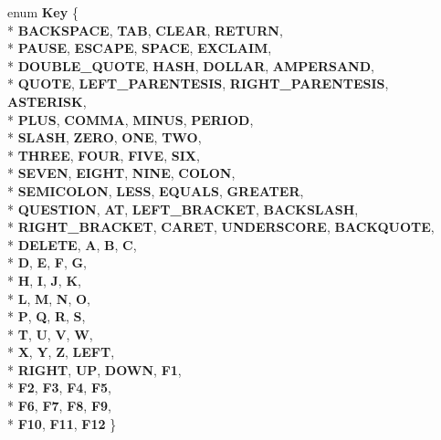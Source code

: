 \begin{DoxyCompactItemize}
\item 
enum {\bfseries Key} \{ \\*
{\bfseries B\+A\+C\+K\+S\+P\+A\+CE}, 
{\bfseries T\+AB}, 
{\bfseries C\+L\+E\+AR}, 
{\bfseries R\+E\+T\+U\+RN}, 
\\*
{\bfseries P\+A\+U\+SE}, 
{\bfseries E\+S\+C\+A\+PE}, 
{\bfseries S\+P\+A\+CE}, 
{\bfseries E\+X\+C\+L\+A\+IM}, 
\\*
{\bfseries D\+O\+U\+B\+L\+E\+\_\+\+Q\+U\+O\+TE}, 
{\bfseries H\+A\+SH}, 
{\bfseries D\+O\+L\+L\+AR}, 
{\bfseries A\+M\+P\+E\+R\+S\+A\+ND}, 
\\*
{\bfseries Q\+U\+O\+TE}, 
{\bfseries L\+E\+F\+T\+\_\+\+P\+A\+R\+E\+N\+T\+E\+S\+IS}, 
{\bfseries R\+I\+G\+H\+T\+\_\+\+P\+A\+R\+E\+N\+T\+E\+S\+IS}, 
{\bfseries A\+S\+T\+E\+R\+I\+SK}, 
\\*
{\bfseries P\+L\+US}, 
{\bfseries C\+O\+M\+MA}, 
{\bfseries M\+I\+N\+US}, 
{\bfseries P\+E\+R\+I\+OD}, 
\\*
{\bfseries S\+L\+A\+SH}, 
{\bfseries Z\+E\+RO}, 
{\bfseries O\+NE}, 
{\bfseries T\+WO}, 
\\*
{\bfseries T\+H\+R\+EE}, 
{\bfseries F\+O\+UR}, 
{\bfseries F\+I\+VE}, 
{\bfseries S\+IX}, 
\\*
{\bfseries S\+E\+V\+EN}, 
{\bfseries E\+I\+G\+HT}, 
{\bfseries N\+I\+NE}, 
{\bfseries C\+O\+L\+ON}, 
\\*
{\bfseries S\+E\+M\+I\+C\+O\+L\+ON}, 
{\bfseries L\+E\+SS}, 
{\bfseries E\+Q\+U\+A\+LS}, 
{\bfseries G\+R\+E\+A\+T\+ER}, 
\\*
{\bfseries Q\+U\+E\+S\+T\+I\+ON}, 
{\bfseries AT}, 
{\bfseries L\+E\+F\+T\+\_\+\+B\+R\+A\+C\+K\+ET}, 
{\bfseries B\+A\+C\+K\+S\+L\+A\+SH}, 
\\*
{\bfseries R\+I\+G\+H\+T\+\_\+\+B\+R\+A\+C\+K\+ET}, 
{\bfseries C\+A\+R\+ET}, 
{\bfseries U\+N\+D\+E\+R\+S\+C\+O\+RE}, 
{\bfseries B\+A\+C\+K\+Q\+U\+O\+TE}, 
\\*
{\bfseries D\+E\+L\+E\+TE}, 
{\bfseries A}, 
{\bfseries B}, 
{\bfseries C}, 
\\*
{\bfseries D}, 
{\bfseries E}, 
{\bfseries F}, 
{\bfseries G}, 
\\*
{\bfseries H}, 
{\bfseries I}, 
{\bfseries J}, 
{\bfseries K}, 
\\*
{\bfseries L}, 
{\bfseries M}, 
{\bfseries N}, 
{\bfseries O}, 
\\*
{\bfseries P}, 
{\bfseries Q}, 
{\bfseries R}, 
{\bfseries S}, 
\\*
{\bfseries T}, 
{\bfseries U}, 
{\bfseries V}, 
{\bfseries W}, 
\\*
{\bfseries X}, 
{\bfseries Y}, 
{\bfseries Z}, 
{\bfseries L\+E\+FT}, 
\\*
{\bfseries R\+I\+G\+HT}, 
{\bfseries UP}, 
{\bfseries D\+O\+WN}, 
{\bfseries F1}, 
\\*
{\bfseries F2}, 
{\bfseries F3}, 
{\bfseries F4}, 
{\bfseries F5}, 
\\*
{\bfseries F6}, 
{\bfseries F7}, 
{\bfseries F8}, 
{\bfseries F9}, 
\\*
{\bfseries F10}, 
{\bfseries F11}, 
{\bfseries F12}
 \}\hypertarget{classengine_1_1_keyboard_event_a75d7913d3ebc66406d7858a359480ad7}{}\label{classengine_1_1_keyboard_event_a75d7913d3ebc66406d7858a359480ad7}


\end{DoxyCompactItemize}
